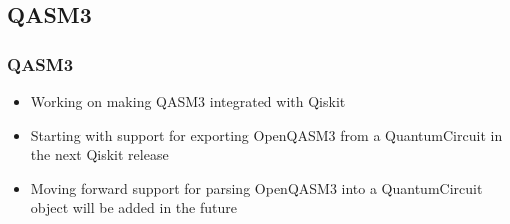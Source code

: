 \documentclass[aspectratio=169,11pt,hyperref={colorlinks=true}]{beamer}
\begin{document}
\subsection{QASM3}
\begin{frame}
    \frametitle{QASM3}
    \begin{itemize}
        \item Working on making QASM3 integrated with Qiskit
        \item Starting with support for exporting OpenQASM3 from a QuantumCircuit in the next Qiskit release
        \item Moving forward support for parsing OpenQASM3 into a QuantumCircuit
            object will be added in the future
    \end{itemize} 
\end{frame}
\end{document}

